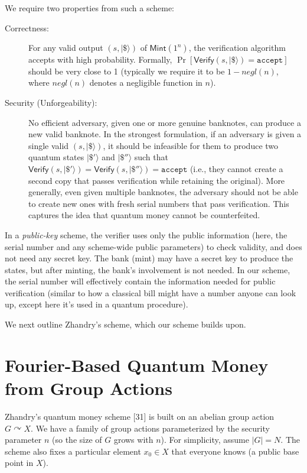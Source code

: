 \documentclass[12pt]{report}
\begin{document}
We require two properties from such a scheme:
\begin{description}
    \item[Correctness:] For any valid output $(s, |\$\rangle)$ of $\mathsf{Mint}(1^n)$, the verification algorithm accepts with high probability. Formally, $\Pr[\mathsf{Verify}(s, |\$\rangle) = \mathtt{accept}]$ should be very close to 1 (typically we require it to be $1 - negl(n)$, where $negl(n)$ denotes a negligible function in $n$).
    \item[Security (Unforgeability):] No efficient adversary, given one or more genuine banknotes, can produce a new valid banknote. In the strongest formulation, if an adversary is given a single valid $(s, |\$\rangle)$, it should be infeasible for them to produce two quantum states $|\$'\rangle$ and $|\$''\rangle$ such that $\mathsf{Verify}(s, |\$'\rangle) = \mathsf{Verify}(s, |\$''\rangle) = \mathtt{accept}$ (i.e., they cannot create a second copy that passes verification while retaining the original). More generally, even given multiple banknotes, the adversary should not be able to create new ones with fresh serial numbers that pass verification. This captures the idea that quantum money cannot be counterfeited.
\end{description}

In a \emph{public-key} scheme, the verifier uses only the public information (here, the serial number and any scheme-wide public parameters) to check validity, and does not need any secret key. The bank (mint) may have a secret key to produce the states, but after minting, the bank’s involvement is not needed. In our scheme, the serial number will effectively contain the information needed for public verification (similar to how a classical bill might have a number anyone can look up, except here it’s used in a quantum procedure).

We next outline Zhandry’s scheme, which our scheme builds upon.

\section{Fourier-Based Quantum Money from Group Actions}
Zhandry’s quantum money scheme [31] is built on an abelian group action $G \curvearrowright X$. We have a family of group actions parameterized by the security parameter $n$ (so the size of $G$ grows with $n$). For simplicity, assume $|G| = N$. The scheme also fixes a particular element $x_0 \in X$ that everyone knows (a public base point in $X$).
\end{document}
